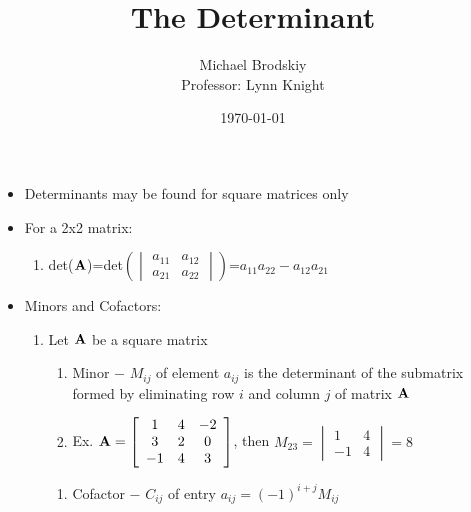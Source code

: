 \documentclass[12pt]{article}
\title{The Determinant}
\date{\today}
\author{Michael Brodskiy\\ \small Professor: Lynn Knight}
\begin{document}
\maketitle

\begin{itemize}

  \item Determinants may be found for square matrices only

  \item For a 2x2 matrix:

    \begin{enumerate}

      \item det($\bold{A}$)=det$\left(\begin{vmatrix} a_{11} & a_{12}\\ a_{21} & a_{22}  \end{vmatrix}\right)$=$a_{11}a_{22}-a_{12}a_{21}$

    \end{enumerate}

  \item Minors and Cofactors:

    \begin{enumerate}

      \item Let $\bold{A}$ be a square matrix

        \begin{enumerate}

          \item Minor $-$ $M_{ij}$ of element $a_{ij}$ is the determinant of the submatrix formed by eliminating row $i$ and column $j$ of matrix $\bold{A}$

          \item Ex. $\bold{A}=\left[ \begin{array}{c c c} 1 & 4 & -2\\ 3 & 2 & 0\\ -1 & 4 & 3\\ \end{array}\right]$, then $M_{23}=\begin{vmatrix} 1 & 4\\ -1 & 4 \end{vmatrix}=8$

        \end{enumerate} 

        \begin{enumerate}

      \item Cofactor $-$ $C_{ij}$ of entry $a_{ij}=(-1)^{i+j}M_{ij}$


\end{enumerate}
\end{enumerate}
\end{itemize}
\end{document}
